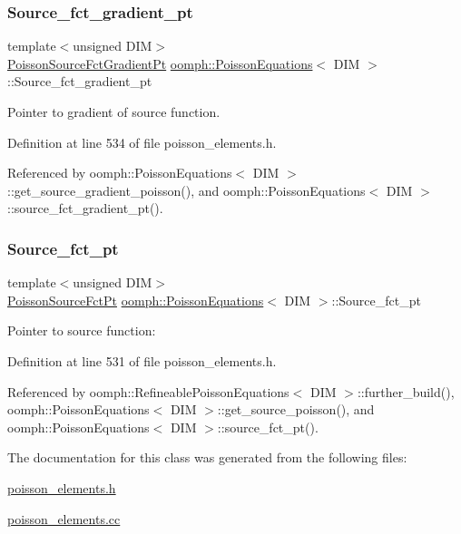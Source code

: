 \subsubsection{\texorpdfstring{Source\+\_\+fct\+\_\+gradient\+\_\+pt}{Source\_fct\_gradient\_pt}}
{\footnotesize\ttfamily template$<$unsigned D\+IM$>$ \\
\hyperlink{classoomph_1_1PoissonEquations_a6182c46eb07d6219d6f939f0962724c4}{Poisson\+Source\+Fct\+Gradient\+Pt} \hyperlink{classoomph_1_1PoissonEquations}{oomph\+::\+Poisson\+Equations}$<$ D\+IM $>$\+::Source\+\_\+fct\+\_\+gradient\+\_\+pt\hspace{0.3cm}{\ttfamily [protected]}}



Pointer to gradient of source function. 



Definition at line 534 of file poisson\+\_\+elements.\+h.



Referenced by oomph\+::\+Poisson\+Equations$<$ D\+I\+M $>$\+::get\+\_\+source\+\_\+gradient\+\_\+poisson(), and oomph\+::\+Poisson\+Equations$<$ D\+I\+M $>$\+::source\+\_\+fct\+\_\+gradient\+\_\+pt().

\mbox{\label{classoomph_1_1PoissonEquations_a4e177939f01ea418aa8a965811877b13}} 
\subsubsection{\texorpdfstring{Source\+\_\+fct\+\_\+pt}{Source\_fct\_pt}}
{\footnotesize\ttfamily template$<$unsigned D\+IM$>$ \\
\hyperlink{classoomph_1_1PoissonEquations_a1e3a857c1f506c99d437fb932a24c828}{Poisson\+Source\+Fct\+Pt} \hyperlink{classoomph_1_1PoissonEquations}{oomph\+::\+Poisson\+Equations}$<$ D\+IM $>$\+::Source\+\_\+fct\+\_\+pt\hspace{0.3cm}{\ttfamily [protected]}}



Pointer to source function\+: 



Definition at line 531 of file poisson\+\_\+elements.\+h.



Referenced by oomph\+::\+Refineable\+Poisson\+Equations$<$ D\+I\+M $>$\+::further\+\_\+build(), oomph\+::\+Poisson\+Equations$<$ D\+I\+M $>$\+::get\+\_\+source\+\_\+poisson(), and oomph\+::\+Poisson\+Equations$<$ D\+I\+M $>$\+::source\+\_\+fct\+\_\+pt().



The documentation for this class was generated from the following files\+:\begin{DoxyCompactItemize}
\item 
\hyperlink{poisson__elements_8h}{poisson\+\_\+elements.\+h}\item 
\hyperlink{poisson__elements_8cc}{poisson\+\_\+elements.\+cc}\end{DoxyCompactItemize}
